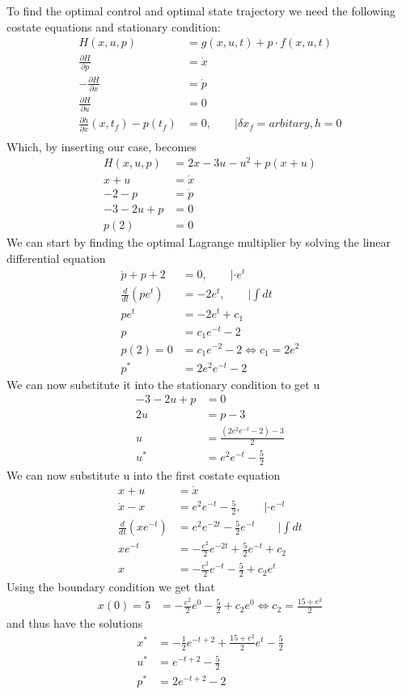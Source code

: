 \documentclass{article}
\begin{document}
To find the optimal control and optimal state trajectory we need the following costate equations and stationary condition:
\begin{align}
	H(x,u,p) &= g(x,u,t) + p\cdot f(x,u,t)\\
	\frac{\partial H}{\partial p} &= \dot{x} \\
	-\frac{\partial H}{\partial x} &= \dot{p} \\
	\frac{\partial H}{\partial u} &= 0 \\ 
	\frac{\partial h}{\partial x}(x,t_f) - p(t_f) &= 0, \qquad |\delta x_f = arbitary, h=0 \\
\end{align}
Which, by inserting our case, becomes
\begin{align}
	H(x,u,p) &= 2x-3u-u^2 + p (x+u)\\
	x+u &= \dot{x} \\
	-2-p &= \dot{p} \\
	-3-2u+p &= 0 \\ 
	p(2) &= 0
\end{align}
We can start by finding the optimal Lagrange multiplier by solving the linear differential equation
\begin{align}
	\dot{p} + p + 2 &= 0, \qquad | \cdot e^{t} \\
	\frac{d}{dt}\left(pe^{t}\right) &= -2 e^{t},	\qquad |\int dt\\
	p e^{t} &= -2e^{t} +c_1\\
	p &= c_1 e^{-t}-2 \\
	p(2) = 0 &= c_1e^{-2}-2 \iff c_1 = 2e^{2}\\
	p^* &= 2e^{2}e^{-t}-2
\end{align}
We can now substitute it into the stationary condition to get u
\begin{align}
	-3-2u+p &= 0\\
	2u &= p-3\\
	u &= \frac{(2e^{2}e^{-t}-2)-3}{2} \\
	u^* &= e^{2}e^{-t} - \frac{5}{2}
\end{align}
We can now substitute u into the first costate equation
\begin{align}
	x+u &= \dot{x} \\
	\dot{x} -x &= e^{2}e^{-t} - \frac{5}{2}, \qquad |\cdot e^{-t}  \\
	\frac{d}{dt}\left(x e^{-t}\right) &= e^{2}e^{-2t} - \frac{5}{2}e^{-t} \qquad |\int dt\\
	x e^{-t} &= -\frac{e^{2}}{2}e^{-2t}+ \frac{5}{2}e^{-t} + c_2 \\
	x &= -\frac{e^{2}}{2}e^{-t}- \frac{5}{2} + c_2e^t
\end{align}
Using the boundary condition we get that
\begin{align}
	x(0) = 5 &= -\frac{e^{2}}{2}e^{0}- \frac{5}{2} + c_2e^0 \iff c_2 = \frac{15+e^2}{2}
\end{align}
and thus have the solutions
\begin{align}
	x^* &= -\frac{1}{2}e^{-t+2} + \frac{15+e^2}{2}e^t- \frac{5}{2} \\
	u^* &= e^{-t+2} - \frac{5}{2}\\
	p^* &= 2e^{-t+2}-2
\end{align}
\end{document}
